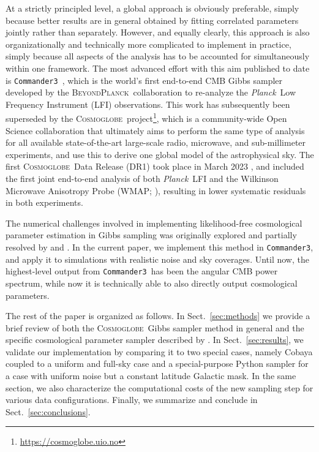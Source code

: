 \documentclass[twocolumn]{../common/aa}
\def\Planck{\emph{Planck}}
\def\commanderthree{\texttt{Commander3}}
\newcommand{\BP}{\textsc{BeyondPlanck}}
\newcommand{\cosmoglobe}{\textsc{Cosmoglobe}}
\begin{document}
At a strictly principled level, a global approach is obviously preferable, simply because better results are in general obtained by fitting correlated parameters jointly rather than separately. However, and equally clearly, this approach is also organizationally and technically more complicated to implement in practice, simply because all aspects of the analysis has to be accounted for simultaneously within one framework. The most advanced effort with this aim published to date is \commanderthree\ \citep{bp03}, which is the world's first end-to-end CMB Gibbs sampler developed by the \BP\ collaboration to re-analyze the \Planck\ Low Frequency Instrument (LFI) observations. This work has subsequently been superseded by the \cosmoglobe\ project\footnote{\url{https://cosmoglobe.uio.no}}, which is a community-wide Open Science collaboration that ultimately aims to perform the same type of analysis for all available state-of-the-art large-scale radio, microwave, and sub-millimeter experiments, and use this to derive one global model of the astrophysical sky. The first \cosmoglobe\ Data Release (DR1) took place in March 2023 \citep{watts2023_dr1}, and included the first joint end-to-end analysis of both \Planck\ LFI and the Wilkinson Microwave Anisotropy Probe (WMAP; \citealp{bennett2012}), resulting in lower systematic residuals in both experiments.

The numerical challenges involved in implementing likelihood-free cosmological parameter estimation in Gibbs sampling was originally explored and partially resolved by \citet{jewell:2009} and \citet{racine:2016}. In the current paper, we implement this method in \commanderthree, and apply it to simulations with realistic noise and sky coverages. Until now, the highest-level output from \commanderthree\ has been the angular CMB power spectrum, while now it is technically able to also directly output cosmological parameters.

The rest of the paper is organized as follows. In Sect.~\ref{sec:methods} we provide a brief review of both the \cosmoglobe\ Gibbs sampler method in general and the specific cosmological parameter sampler described by \citet{racine:2016}. In Sect.~\ref{sec:results}, we validate our implementation by comparing it to two special cases, namely Cobaya coupled to a uniform and full-sky case and a special-purpose Python sampler for a case with uniform noise but a constant latitude Galactic mask. In the same section, we also characterize the computational costs of the new sampling step for various data configurations. Finally, we summarize and conclude in Sect.~\ref{sec:conclusions}.
\end{document}
